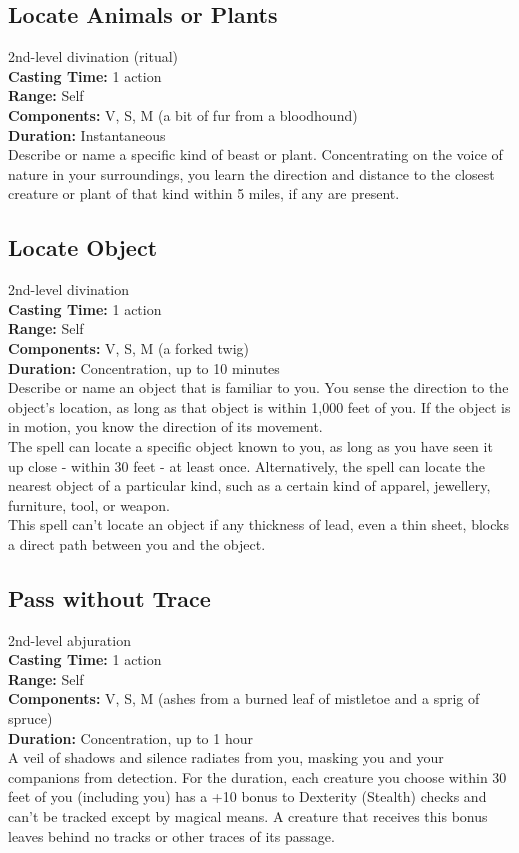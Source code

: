 \documentclass[11pt, A4paper, english]{article}
\begin{document}
		\subsection{Locate Animals or Plants}
2nd-level divination (ritual) \\
\textbf{Casting Time:} 1 action \\
\textbf{Range:} Self \\
\textbf{Components:} V, S, M (a bit of fur from a bloodhound) \\
\textbf{Duration:} Instantaneous \\
Describe or name a specific kind of beast or plant. Concentrating on the voice of nature in your surroundings, you learn the direction and distance to the closest creature or plant of that kind within 5 miles, if any are present.

		\subsection{Locate Object}
2nd-level divination \\
\textbf{Casting Time:} 1 action \\
\textbf{Range:} Self \\
\textbf{Components:} V, S, M (a forked twig) \\
\textbf{Duration:} Concentration, up to 10 minutes \\
Describe or name an object that is familiar to you. You sense the direction to the object's location, as long as that object is within 1,000 feet of you. If the object is in motion, you know the direction of its movement. \\
The spell can locate a specific object known to you, as long as you have seen it up close - within 30 feet - at least once. Alternatively, the spell can locate the nearest object of a particular kind, such as a certain kind of apparel, jewellery, furniture, tool, or weapon. \\
This spell can't locate an object if any thickness of lead, even a thin sheet, blocks a direct path between you and the object.

		\subsection{Pass without Trace}
2nd-level abjuration \\
\textbf{Casting Time:} 1 action \\
\textbf{Range:} Self \\
\textbf{Components:} V, S, M (ashes from a burned leaf of mistletoe and a sprig of spruce) \\
\textbf{Duration:} Concentration, up to 1 hour \\
A veil of shadows and silence radiates from you, masking you and your companions from detection. For the duration, each creature you choose within 30 feet of you (including you) has a +10 bonus to Dexterity (Stealth) checks and can’t be tracked except by magical means. A creature that receives this bonus leaves behind no tracks or other traces of its passage.
\end{document}
